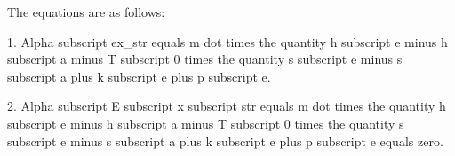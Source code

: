 The equations are as follows:

1. Alpha subscript ex_str equals m dot times the quantity h subscript e minus h subscript a minus T subscript 0 times the quantity s subscript e minus s subscript a plus k subscript e plus p subscript e.

2. Alpha subscript E subscript x subscript str equals m dot times the quantity h subscript e minus h subscript a minus T subscript 0 times the quantity s subscript e minus s subscript a plus k subscript e plus p subscript e equals zero.